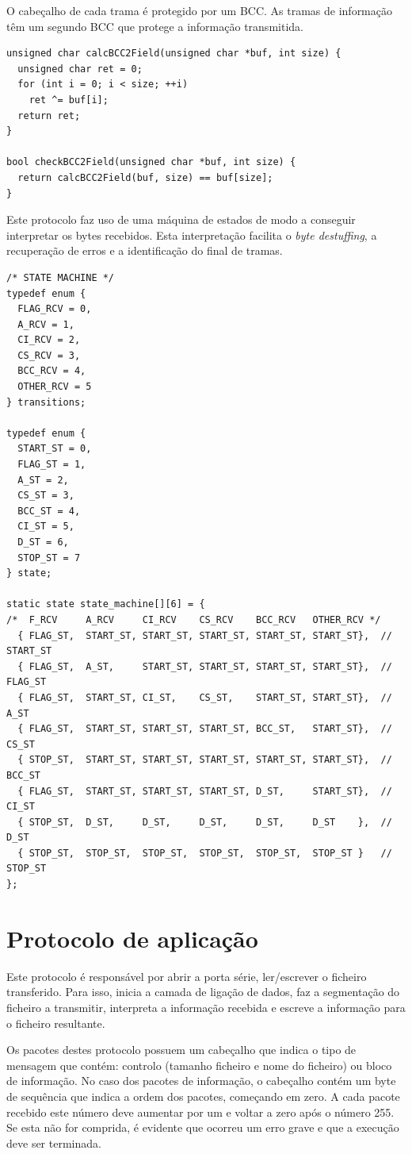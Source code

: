 \documentclass[11pt]{report}
\begin{document}
O cabeçalho de cada trama é protegido por um BCC. As tramas de informação têm um
segundo BCC que protege a informação transmitida.
\begin{lstlisting}
unsigned char calcBCC2Field(unsigned char *buf, int size) {
  unsigned char ret = 0;
  for (int i = 0; i < size; ++i)
    ret ^= buf[i];
  return ret;
}

bool checkBCC2Field(unsigned char *buf, int size) {
  return calcBCC2Field(buf, size) == buf[size];
}
\end{lstlisting}

Este protocolo faz uso de uma máquina de estados de modo a conseguir interpretar
os bytes recebidos. Esta interpretação facilita o \textit{byte destuffing}, a
recuperação de erros e a identificação do final de tramas.
\begin{lstlisting}
/* STATE MACHINE */
typedef enum {
  FLAG_RCV = 0,
  A_RCV = 1,
  CI_RCV = 2,
  CS_RCV = 3,
  BCC_RCV = 4,
  OTHER_RCV = 5
} transitions;

typedef enum {
  START_ST = 0,
  FLAG_ST = 1,
  A_ST = 2,
  CS_ST = 3,
  BCC_ST = 4,
  CI_ST = 5,
  D_ST = 6,
  STOP_ST = 7
} state;

static state state_machine[][6] = {
/*  F_RCV     A_RCV     CI_RCV    CS_RCV    BCC_RCV   OTHER_RCV */
  { FLAG_ST,  START_ST, START_ST, START_ST, START_ST, START_ST},  // START_ST
  { FLAG_ST,  A_ST,     START_ST, START_ST, START_ST, START_ST},  // FLAG_ST
  { FLAG_ST,  START_ST, CI_ST,    CS_ST,    START_ST, START_ST},  // A_ST
  { FLAG_ST,  START_ST, START_ST, START_ST, BCC_ST,   START_ST},  // CS_ST
  { STOP_ST,  START_ST, START_ST, START_ST, START_ST, START_ST},  // BCC_ST
  { FLAG_ST,  START_ST, START_ST, START_ST, D_ST,     START_ST},  // CI_ST
  { STOP_ST,  D_ST,     D_ST,     D_ST,     D_ST,     D_ST    },  // D_ST
  { STOP_ST,  STOP_ST,  STOP_ST,  STOP_ST,  STOP_ST,  STOP_ST }   // STOP_ST
};
\end{lstlisting}

\section{Protocolo de aplicação}

Este protocolo é responsável por abrir a porta série, ler/escrever o ficheiro
transferido. Para isso, inicia a camada de ligação de dados, faz a segmentação
do ficheiro a transmitir, interpreta a informação recebida e escreve a
informação para o ficheiro resultante.

Os pacotes destes protocolo possuem um cabeçalho que indica o tipo de mensagem
que contém: controlo (tamanho ficheiro e nome do ficheiro) ou bloco de
informação. No caso dos pacotes de informação, o cabeçalho contém um byte
de sequência que indica a ordem dos pacotes, começando em zero. A cada pacote
recebido este número deve aumentar por um e voltar a zero após o número 255.
Se esta não for comprida, é evidente que ocorreu um erro grave e que a execução
deve ser terminada.
\end{document}
